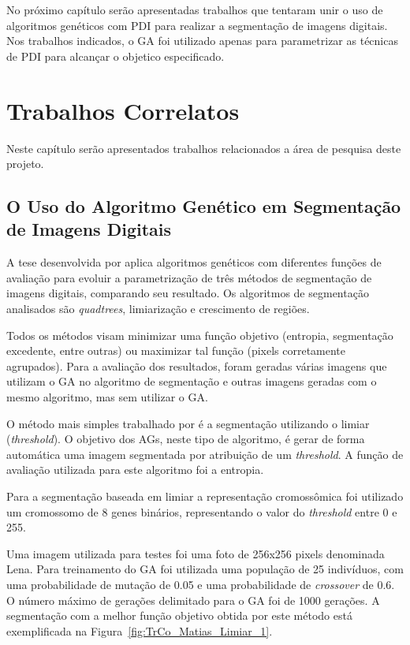 \documentclass[12pt,oneside,a4paper,english,french,spanish,brazil,]{abntex2}
\begin{document}
No próximo capítulo serão apresentadas trabalhos que tentaram unir o uso de algoritmos genéticos com PDI para realizar a segmentação de imagens digitais. Nos trabalhos indicados, o GA foi utilizado apenas para parametrizar as técnicas de PDI para alcançar o objetico especificado.

\chapter{Trabalhos Correlatos}
\label{chap:TrabalhosCorrelatos}

Neste capítulo serão apresentados trabalhos relacionados a área de pesquisa deste projeto.


\section{O Uso do Algoritmo Genético em Segmentação de Imagens Digitais}

A tese desenvolvida por \citet{matias:2007} aplica algoritmos genéticos com diferentes funções de avaliação para evoluir a parametrização de três métodos de segmentação de imagens digitais, comparando seu resultado. Os algoritmos de segmentação analisados são \textit{quadtrees}, limiarização e crescimento de regiões.

Todos os métodos visam minimizar uma função objetivo (entropia, segmentação excedente, entre outras) ou maximizar tal função (pixels corretamente agrupados). Para a avaliação dos resultados, foram geradas várias imagens que utilizam o GA no algoritmo de segmentação e outras imagens geradas com o mesmo algoritmo, mas sem utilizar o GA. 

O método mais simples trabalhado por \citet{matias:2007} é a segmentação utilizando o limiar (\textit{threshold}). O objetivo dos AGs, neste tipo de algoritmo, é gerar de forma automática uma imagem segmentada por atribuição de um \textit{threshold}. A função de avaliação utilizada para este algoritmo foi a entropia.

Para a segmentação baseada em limiar a representação cromossômica foi utilizado um cromossomo de 8 genes binários, representando o valor do \textit{threshold} entre 0 e 255. 

Uma imagem utilizada para testes foi uma foto de 256x256 pixels denominada Lena. Para treinamento do GA foi utilizada uma população de 25 indivíduos, com uma probabilidade de mutação de 0.05 e uma probabilidade de \textit{crossover} de 0.6. O número máximo de gerações delimitado para o GA foi de 1000 gerações. A segmentação com a melhor função objetivo obtida por este método está exemplificada na Figura~\ref{fig:TrCo_Matias_Limiar_1}.
\end{document}
